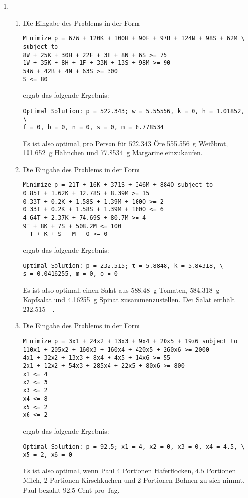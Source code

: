 \documentclass[a4paper]{scrartcl}
\begin{document}
\begin{enumerate}[label=\bfseries\arabic*.]
\begin{enumerate}
        \end{enumerate}

    \item
        \begin{enumerate}
            \item
                Die Eingabe des Problems in der Form
                \begin{verbatim}
Minimize p = 67W + 120K + 100H + 90F + 97B + 124N + 98S + 62M \
subject to
8W + 25K + 30H + 22F + 3B + 8N + 6S >= 75
1W + 35K + 8H + 1F + 33N + 13S + 98M >= 90
54W + 42B + 4N + 63S >= 300
S <= 80 \end{verbatim}
                ergab das folgende Ergebnis:
                \begin{verbatim}
Optimal Solution: p = 522.343; w = 5.55556, k = 0, h = 1.01852, \
f = 0, b = 0, n = 0, s = 0, m = 0.778534 \end{verbatim}
                Es ist also optimal, pro Person für $522.343$ Öre
                \SI{555,556}{\gram} Weißbrot, \SI{101,652}{\gram} Hähnchen
                und \SI{77,8534}{\gram} Margarine einzukaufen.

            \item
                Die Eingabe des Problems in der Form
                \begin{verbatim}
Minimize p = 21T + 16K + 371S + 346M + 884O subject to
0.85T + 1.62K + 12.78S + 8.39M >= 15
0.33T + 0.2K + 1.58S + 1.39M + 100O >= 2
0.33T + 0.2K + 1.58S + 1.39M + 100O <= 6
4.64T + 2.37K + 74.69S + 80.7M >= 4
9T + 8K + 7S + 508.2M <= 100
- T + K + S - M - O <= 0 \end{verbatim}
                ergab das folgende Ergebnis:
                \begin{verbatim}
Optimal Solution: p = 232.515; t = 5.8848, k = 5.84318, \
s = 0.0416255, m = 0, o = 0 \end{verbatim}
                Es ist also optimal, einen Salat aus \SI{588,48}{\gram} Tomaten,
                \SI{584,318}{\gram} Kopfsalat und \SI{4,16255}{\gram} Spinat
                zusammenzustellen.
                Der Salat enthält \SI{232,515}{\kilo\calorie}.

            \item
                Die Eingabe des Problems in der Form
                \begin{verbatim}
Minimize p = 3x1 + 24x2 + 13x3 + 9x4 + 20x5 + 19x6 subject to
110x1 + 205x2 + 160x3 + 160x4 + 420x5 + 260x6 >= 2000
4x1 + 32x2 + 13x3 + 8x4 + 4x5 + 14x6 >= 55
2x1 + 12x2 + 54x3 + 285x4 + 22x5 + 80x6 >= 800
x1 <= 4
x2 <= 3
x3 <= 2
x4 <= 8
x5 <= 2
x6 <= 2 \end{verbatim}
                ergab das folgende Ergebnis:
                \begin{verbatim}
Optimal Solution: p = 92.5; x1 = 4, x2 = 0, x3 = 0, x4 = 4.5, \
x5 = 2, x6 = 0 \end{verbatim}
                Es ist also optimal, wenn Paul $4$ Portionen Haferflocken,
                $4.5$ Portionen Milch, 2 Portionen Kirschkuchen und 2 Portionen
                Bohnen zu sich nimmt.
                Paul bezahlt $92.5$ Cent pro Tag.


\end{enumerate}
\end{enumerate}
\end{document}
